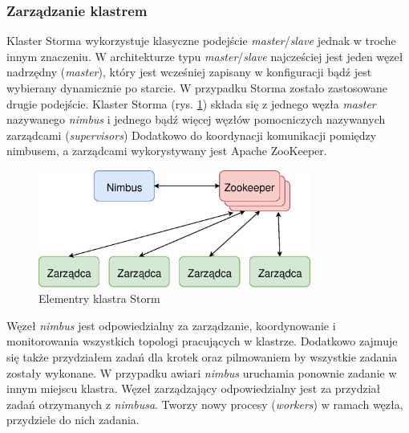 \subsubsection*{Zarządzanie klastrem}
Klaster Storma wykorzystuje klasyczne podejście \textit{master}/\textit{slave}
jednak w troche innym znaczeniu.
W architekturze typu \textit{master}/\textit{slave} najcześciej jest jeden węzeł nadrzędny (\textit{master}),
który jest wcześniej zapisany w konfiguracji
bądź jest wybierany dynamicznie po starcie.
W przypadku Storma zostało zastosowane drugie podejście.
Klaster Storma (rys. \ref{fig:StormCluster}) składa się z jednego węzła \textit{master} nazywanego \textit{nimbus}
i jednego bądź więcej węzłów pomocniczych nazywanych zarządcami (\textit{supervisors})
Dodatkowo do koordynacji komunikacji pomiędzy nimbusem,
a zarządcami wykorystywany jest Apache ZooKeeper.
\begin{figure}[htbp]
  \centering
  \includegraphics[width=0.8\textwidth]{img/stormCluster}
  \caption{Elementry klastra Storm}
  \label{fig:StormCluster}
\end{figure}

Węzeł \textit{nimbus} jest odpowiedzialny za zarządzanie,
koordynowanie i monitorowania wszystkich topologi pracujących w klastrze.
Dodatkowo zajmuje się także przydziałem zadań dla krotek
oraz pilmowaniem by wszystkie zadania zostały wykonane.
W przypadku awiari \textit{nimbus} uruchamia ponownie zadanie w innym miejscu klastra.
Węzeł zarządzający odpowiedzialny jest za przydział zadań otrzymanych z \textit{nimbusa}.
Tworzy nowy procesy (\textit{workers}) w ramach węzła,
przydziele do nich zadania.
